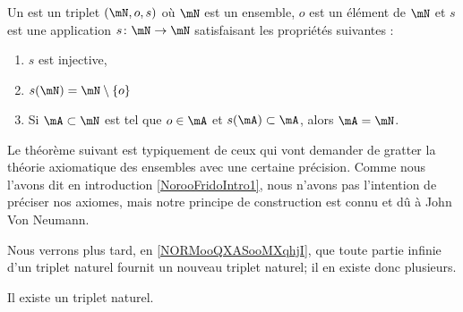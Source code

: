 \begin{definition}     \label{DEFooBJBOooWlblAx}
	Un  est un triplet \( (\mN, o, s)\) où \( \mN\) est un ensemble, \( o\) est un élément de \( \mN\) et \( s\) est une application \( s\colon \mN\to \mN\) satisfaisant les propriétés suivantes :
	\begin{enumerate}
		\item
		      \( s\) est injective,
		\item       \label{ITEMooQAKJooGKdJsM}
		      \( s(\mN)=\mN\setminus \{ o \} \)
		\item       \label{ITEMooXPYEooFajywh}
		      Si \( \mA\subset \mN\) est tel que \( o\in \mA\) et \( s(\mA)\subset \mA\), alors \( \mA=\mN\).
	\end{enumerate}
\end{definition}

\begin{normaltext}	\label{NORMooTripletNaturelGratterTheoEns}
	Le théorème suivant est typiquement de ceux qui vont demander de gratter la théorie axiomatique des ensembles avec une certaine précision. Comme nous l'avons dit en introduction \ref{NorooFridoIntro1}, nous n'avons pas l'intention de préciser nos axiomes, mais notre principe de construction est connu et dû à John Von Neumann.

	Nous verrons plus tard, en \ref{NORMooQXASooMXqhjI}, que toute partie infinie d'un triplet naturel fournit un nouveau triplet naturel; il en existe donc plusieurs.
\end{normaltext}

\begin{theorem}     \label{THOooOXMHooXYgMqb}
	Il existe un triplet naturel.
\end{theorem}


